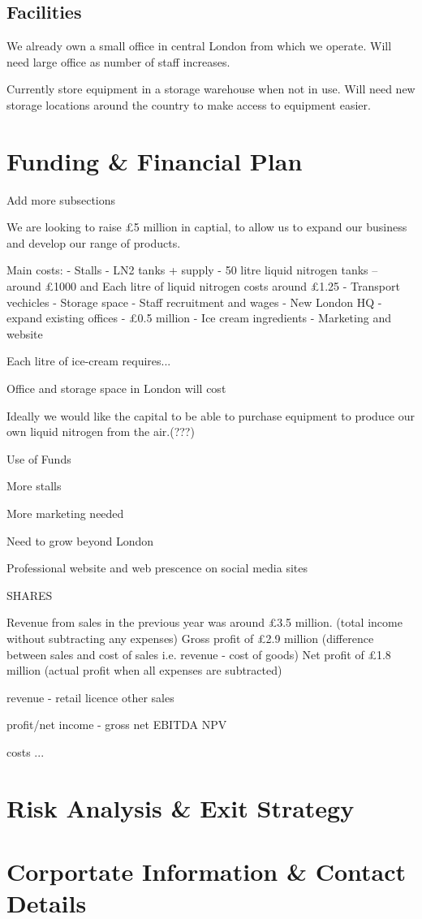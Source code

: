 \documentclass{article}
\begin{document}
  \subsection{Facilities}

  We already own a small office in central London from which we operate.
  Will need large office as number of staff increases.

  Currently store equipment in a storage warehouse when not in use.
  Will need new storage locations around the country to make access to equipment easier.


\section{Funding \& Financial Plan}
Add more subsections

We are looking to raise £5 million in captial, to allow us to expand our business and develop our range of products.

Main costs:
 - Stalls - LN2 tanks + supply - 50 litre liquid nitrogen tanks – around £1000 and Each litre of liquid nitrogen costs around £1.25
 - Transport vechicles
 - Storage space
 - Staff recruitment and wages
 - New London HQ - expand existing offices - £0.5 million
 - Ice cream ingredients
 - Marketing and website




Each litre of ice-cream requires...

Office and storage space in London will cost

Ideally we would like the capital to be able to purchase equipment to
produce our own liquid nitrogen from the air.(???)

Use of Funds

More stalls

More marketing needed

Need to grow beyond London

Professional website and web prescence on social media sites


SHARES

Revenue from sales in the previous year was around £3.5 million. (total income without subtracting any expenses) 
Gross profit of £2.9 million (difference between sales and cost of sales i.e. revenue - cost of goods)
Net profit of £1.8 million (actual profit when all expenses are subtracted)



revenue
 - retail
   licence
   other sales

profit/net income
 - gross
   net
   EBITDA
   NPV

costs
 ...

\section{Risk Analysis \& Exit Strategy}



\section{Corportate Information \& Contact Details}
\end{document}
